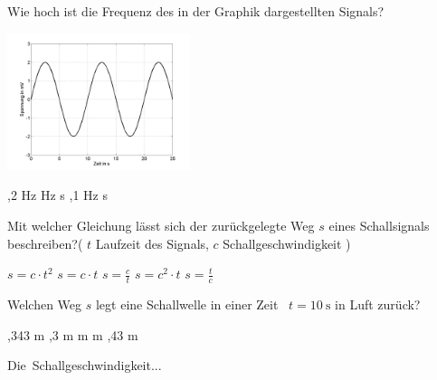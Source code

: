 \documentclass[11pt]{exam}
\begin{document}
\setlength{\voffset}{-0.5in}
\setlength{\headsep}{5pt}

\hspace{2mm}
 \hspace{5mm}
\vspace{4mm}

\begin{questions}

\question Wie hoch ist die Frequenz des in der Graphik dargestellten Signals? 

\includegraphics[width=0.4\textwidth]{images/SchallSinus1.png}

\begin{choices}
	,2 Hz
	 Hz
	 s
	,1 Hz
	 s
\end{choices}

\vspace{3mm}\question Mit welcher Gleichung lässt sich der zurückgelegte Weg \( s \) eines Schallsignals beschreiben?( \( t \) Laufzeit des Signals, \( c \) Schallgeschwindigkeit )

\begin{choices}
	\choice \( s = c \cdot t^2 \)
	\choice \( s=c \cdot t \)
	\choice \( s= \frac{c}{t} \)
	\choice \( s=c^2 \cdot t \)
	\choice \( s= \frac{t}{c} \)
\end{choices}

\vspace{3mm}\question Welchen Weg \( s \) legt eine Schallwelle in einer Zeit  \( t= \mathrm{10~s} \) in Luft zurück?

\begin{choices}
	,343 m
	,3 m
	 m
	 m
	,43 m
\end{choices}

\vspace{3mm}\question Die Schallgeschwindigkeit...


\end{questions}
\end{document}

